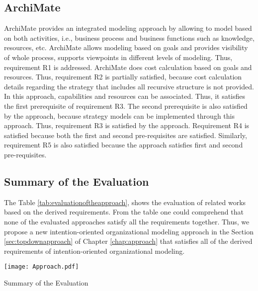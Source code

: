 \subsection{ArchiMate}
ArchiMate provides an integrated modeling approach by allowing to model based on both activities, i.e., business process and business functions such as knowledge, resources, etc. ArchiMate allows modeling based on goals and provides visibility of whole process, supports viewpoints in different levels of modeling. Thus, requirement R1 is addressed. ArchiMate does cost calculation based on goals and resources. Thus, requirement R2 is partially satisfied, because cost calculation details regarding the strategy that includes all recursive structure is not provided.  In this approach, capabilities and resources can be associated. Thus, it satisfies the first prerequisite of requirement R3. The second prerequisite is also satisfied by the approach, because strategy models can be implemented through this approach. Thus, requirement R3 is satisfied by the approach. Requirement R4 is satisfied because both the first and second pre-requisites are satisfied. Similarly, requirement R5 is also satisfied because the approach satisfies first and second pre-requisites.  

\subsection {Summary of the Evaluation}
 The Table \ref{tab:evaluationoftheapproach}, shows the evaluation of related works based on the derived requirements. From the table one could comprehend that none of the evaluated approaches satisfy all the requirements together. Thus, we propose a new intention-oriented organizational modeling approach in the Section \ref{sec:topdownapproach} of Chapter \ref{chap:approach} that satisfies all of the derived requirements of intention-oriented organizational modeling. 

 \begin{table}
 	\centering
 	\texttt{[image: Approach.pdf]}
 	\caption{Summary of the Evaluation}
 	\label{tab:evaluationoftheapproach}
 \end{table} 



